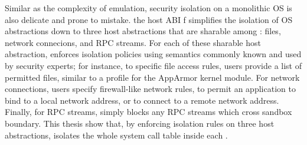 




Similar as the complexity of emulation,
security isolation on a monolithic OS is also delicate and prone to mistake.
the host ABI f \graphene{} simplifies the isolation of OS abstractions
down to three host abstractions that are sharable among \picoprocs{}: files, network connecions, and RPC streams.
For each of these sharable host abstraction, \graphene{} enforces isolation policies using semantics
commonly known and used by security experts;
for instance, to specific file access rules, users provide a list of permitted files, similar to a profile for the AppArmor kernel module.
For network connections,
users specify firewall-like network rules,
to permit an application
to bind to a local network address, or to connect to a remote network address.
Finally, for RPC streams,
\graphene{} simply blocks any RPC streams
which cross sandbox boundary.
This thesis show that,
by enforcing isolation rules on three host abstractions,
\thehostabi{} isolates the whole system call table inside each \picoproc{}.



